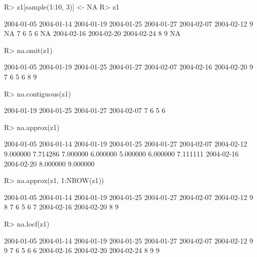 \documentclass{Z}
\begin{document}
\begin{Schunk}
\begin{Sinput}
R> z1[sample(1:10, 3)] <- NA
R> z1
\end{Sinput}
\begin{Soutput}
2004-01-05 2004-01-14 2004-01-19 2004-01-25 2004-01-27 2004-02-07 2004-02-12 
         9         NA          7          6          5          6         NA 
2004-02-16 2004-02-20 2004-02-24 
         8          9         NA 
\end{Soutput}
\begin{Sinput}
R> na.omit(z1)
\end{Sinput}
\begin{Soutput}
2004-01-05 2004-01-19 2004-01-25 2004-01-27 2004-02-07 2004-02-16 2004-02-20 
         9          7          6          5          6          8          9 
\end{Soutput}
\begin{Sinput}
R> na.contiguous(z1)
\end{Sinput}
\begin{Soutput}
2004-01-19 2004-01-25 2004-01-27 2004-02-07 
         7          6          5          6 
\end{Soutput}
\begin{Sinput}
R> na.approx(z1)
\end{Sinput}
\begin{Soutput}
2004-01-05 2004-01-14 2004-01-19 2004-01-25 2004-01-27 2004-02-07 2004-02-12 
  9.000000   7.714286   7.000000   6.000000   5.000000   6.000000   7.111111 
2004-02-16 2004-02-20 
  8.000000   9.000000 
\end{Soutput}
\begin{Sinput}
R> na.approx(z1, 1:NROW(z1))
\end{Sinput}
\begin{Soutput}
2004-01-05 2004-01-14 2004-01-19 2004-01-25 2004-01-27 2004-02-07 2004-02-12 
         9          8          7          6          5          6          7 
2004-02-16 2004-02-20 
         8          9 
\end{Soutput}
\begin{Sinput}
R> na.locf(z1)
\end{Sinput}
\begin{Soutput}
2004-01-05 2004-01-14 2004-01-19 2004-01-25 2004-01-27 2004-02-07 2004-02-12 
         9          9          7          6          5          6          6 
2004-02-16 2004-02-20 2004-02-24 
         8          9          9 
\end{Soutput}
\end{Schunk}
\end{document}
